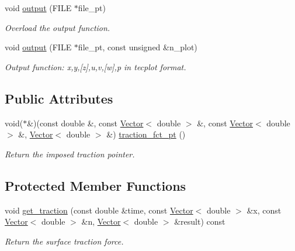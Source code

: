 \begin{DoxyCompactItemize}
void \hyperlink{classoomph_1_1AxisymmetricSolidTractionElement_a3f3170465a5605f057a4b4dc8201c3ca}{output} (F\+I\+LE $\ast$file\+\_\+pt)
\begin{DoxyCompactList}\small\item\em Overload the output function. \end{DoxyCompactList}\item 
void \hyperlink{classoomph_1_1AxisymmetricSolidTractionElement_ad171b0825d7e4a37d7675deaaa789058}{output} (F\+I\+LE $\ast$file\+\_\+pt, const unsigned \&n\+\_\+plot)
\begin{DoxyCompactList}\small\item\em Output function\+: x,y,\mbox{[}z\mbox{]},u,v,\mbox{[}w\mbox{]},p in tecplot format. \end{DoxyCompactList}\end{DoxyCompactItemize}
\subsection*{Public Attributes}
\begin{DoxyCompactItemize}
\item 
void($\ast$\&)(const double \&, const \hyperlink{classoomph_1_1Vector}{Vector}$<$ double $>$ \&, const \hyperlink{classoomph_1_1Vector}{Vector}$<$ double $>$ \&, \hyperlink{classoomph_1_1Vector}{Vector}$<$ double $>$ \&) \hyperlink{classoomph_1_1AxisymmetricSolidTractionElement_a437b43759687da0f3f49e0b13d1afe10}{traction\+\_\+fct\+\_\+pt} ()
\begin{DoxyCompactList}\small\item\em Return the imposed traction pointer. \end{DoxyCompactList}\end{DoxyCompactItemize}
\subsection*{Protected Member Functions}
\begin{DoxyCompactItemize}
\item 
void \hyperlink{classoomph_1_1AxisymmetricSolidTractionElement_a1386f6f1d58c17fc9357f01ddaf38742}{get\+\_\+traction} (const double \&time, const \hyperlink{classoomph_1_1Vector}{Vector}$<$ double $>$ \&x, const \hyperlink{classoomph_1_1Vector}{Vector}$<$ double $>$ \&n, \hyperlink{classoomph_1_1Vector}{Vector}$<$ double $>$ \&result) const
\begin{DoxyCompactList}\small\item\em Return the surface traction force. \end{DoxyCompactList}\end{DoxyCompactItemize}
